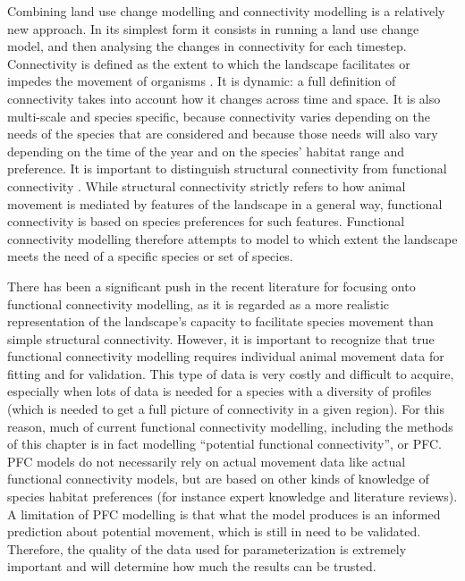 Combining land use change modelling and connectivity modelling is a relatively new approach. In its simplest form it consists in running a land use change model, and then analysing the changes in connectivity for each timestep. Connectivity is defined as the extent to which the landscape facilitates or impedes the movement of organisms \citep{crooks_landscape_2006}. It is dynamic: a full definition of connectivity takes into account how it changes across time and space. It is also multi-scale and species specific, because connectivity varies depending on the needs of the species that are considered and because those needs will also vary depending on the time of the year and on the species’ habitat range and preference. It is important to distinguish structural connectivity from functional connectivity \citep{kindlmann_connectivity_2008}. While structural connectivity strictly refers to how animal movement is mediated by features of the landscape in a general way, functional connectivity is based on species preferences for such features. Functional connectivity modelling therefore attempts to model to which extent the landscape meets the need of a specific species or set of species.

There has been a significant push in the recent literature for focusing onto functional connectivity modelling, as it is regarded as a more realistic representation of  the landscape’s capacity to facilitate species movement than simple structural connectivity. However, it is important to recognize that true functional connectivity modelling requires individual animal movement data for fitting and for validation. This type of data is very costly and difficult to acquire, especially when lots of data is needed for a species with a diversity of profiles (which is needed to get a full picture of connectivity in a given region). For this reason, much of current functional connectivity modelling, including the methods of this chapter is in fact modelling “potential functional connectivity”, or PFC. PFC models do not necessarily rely on actual movement data like actual functional connectivity models, but are based on other kinds of knowledge of species habitat preferences (for instance expert knowledge and literature reviews). A limitation of PFC modelling is that what the model produces is an informed prediction about potential movement, which is still in need to be validated. Therefore, the quality of the data used for parameterization is extremely important and will determine how much the results can be trusted.

